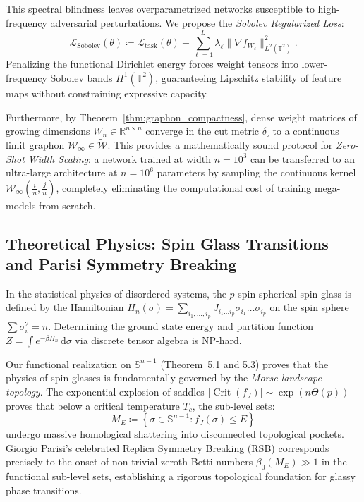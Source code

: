 \documentclass[11pt,a4paper,reqno]{amsart}
\theoremstyle{definition}
\numberwithin{equation}{section}
\providecommand{\R}{\mathbb{R}}
\providecommand{\Sph}{\mathbb{S}}
\newcommand{\Tor}{\mathbb{T}}
\newcommand{\dif}{\,\mathrm{d}}
\providecommand{\Sph}{\mathbb{S}}
\providecommand{\R}{\mathbb{R}}
\begin{document}
This spectral blindness leaves overparametrized networks susceptible to high-frequency adversarial perturbations. We propose the \emph{Sobolev Regularized Loss}:
\begin{equation}
    \label{eq:sobolev_loss}
    \mathcal{L}_{\mathrm{Sobolev}}(\theta) \coloneqq \mathcal{L}_{\mathrm{task}}(\theta) + \sum_{\ell=1}^L \lambda_\ell \|\nabla f_{W_\ell}\|_{L^2(\Tor^2)}^2.
\end{equation}
Penalizing the functional Dirichlet energy forces weight tensors into lower-frequency Sobolev bands $H^1(\Tor^2)$, guaranteeing Lipschitz stability of feature maps without constraining expressive capacity.

Furthermore, by Theorem~\ref{thm:graphon_compactness}, dense weight matrices of growing dimensions $W_n \in \R^{n \times n}$ converge in the cut metric $\delta_\square$ to a continuous limit graphon $\mathcal{W}_\infty \in \widetilde{\mathcal{W}}$. This provides a mathematically sound protocol for \emph{Zero-Shot Width Scaling}: a network trained at width $n = 10^3$ can be transferred to an ultra-large architecture at $n = 10^6$ parameters by sampling the continuous kernel $\mathcal{W}_\infty(\frac{i}{n}, \frac{j}{n})$, completely eliminating the computational cost of training mega-models from scratch.

\subsection{Theoretical Physics: Spin Glass Transitions and Parisi Symmetry Breaking}
\label{subsec:imp_physics}
In the statistical physics of disordered systems, the $p$-spin spherical spin glass is defined by the Hamiltonian $H_n(\sigma) = \sum_{i_1, \dots, i_p} J_{i_1 \dots i_p} \sigma_{i_1} \dots \sigma_{i_p}$ on the spin sphere $\sum \sigma_i^2 = n$. Determining the ground state energy and partition function $Z = \int e^{-\beta H_n} \dif \sigma$ via discrete tensor algebra is NP-hard.

Our functional realization on $\Sph^{n-1}$ (Theorem~5.1 and 5.3) proves that the physics of spin glasses is fundamentally governed by the \emph{Morse landscape topology}. The exponential explosion of saddles $|\operatorname{Crit}(f_J)| \sim \exp(n \Theta(p))$ proves that below a critical temperature $T_c$, the sub-level sets:
\begin{equation}
    M_E \coloneqq \left\{ \sigma \in \Sph^{n-1} \colon f_J(\sigma) \le E \right\}
\end{equation}
undergo massive homological shattering into disconnected topological pockets. Giorgio Parisi's celebrated Replica Symmetry Breaking (RSB) corresponds precisely to the onset of non-trivial zeroth Betti numbers $\beta_0(M_E) \gg 1$ in the functional sub-level sets, establishing a rigorous topological foundation for glassy phase transitions.
\end{document}
